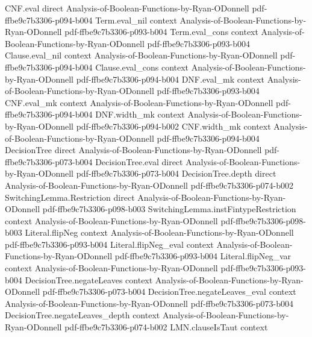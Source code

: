 \begin{lemma}
\proofstep
  {CNF.eval}
  {direct}
  {Analysis-of-Boolean-Functions-by-Ryan-ODonnell}
  {pdf-ffbe9c7b3306-p094-b004}
\proofstep
  {Term.eval_nil}
  {context}
  {Analysis-of-Boolean-Functions-by-Ryan-ODonnell}
  {pdf-ffbe9c7b3306-p093-b004}
\proofstep
  {Term.eval_cons}
  {context}
  {Analysis-of-Boolean-Functions-by-Ryan-ODonnell}
  {pdf-ffbe9c7b3306-p093-b004}
\proofstep
  {Clause.eval_nil}
  {context}
  {Analysis-of-Boolean-Functions-by-Ryan-ODonnell}
  {pdf-ffbe9c7b3306-p094-b004}
\proofstep
  {Clause.eval_cons}
  {context}
  {Analysis-of-Boolean-Functions-by-Ryan-ODonnell}
  {pdf-ffbe9c7b3306-p094-b004}
\proofstep
  {DNF.eval_mk}
  {context}
  {Analysis-of-Boolean-Functions-by-Ryan-ODonnell}
  {pdf-ffbe9c7b3306-p093-b004}
\proofstep
  {CNF.eval_mk}
  {context}
  {Analysis-of-Boolean-Functions-by-Ryan-ODonnell}
  {pdf-ffbe9c7b3306-p094-b004}
\proofstep
  {DNF.width_mk}
  {context}
  {Analysis-of-Boolean-Functions-by-Ryan-ODonnell}
  {pdf-ffbe9c7b3306-p094-b002}
\proofstep
  {CNF.width_mk}
  {context}
  {Analysis-of-Boolean-Functions-by-Ryan-ODonnell}
  {pdf-ffbe9c7b3306-p094-b004}
\proofstep
  {DecisionTree}
  {direct}
  {Analysis-of-Boolean-Functions-by-Ryan-ODonnell}
  {pdf-ffbe9c7b3306-p073-b004}
\proofstep
  {DecisionTree.eval}
  {direct}
  {Analysis-of-Boolean-Functions-by-Ryan-ODonnell}
  {pdf-ffbe9c7b3306-p073-b004}
\proofstep
  {DecisionTree.depth}
  {direct}
  {Analysis-of-Boolean-Functions-by-Ryan-ODonnell}
  {pdf-ffbe9c7b3306-p074-b002}
\proofstep
  {SwitchingLemma.Restriction}
  {direct}
  {Analysis-of-Boolean-Functions-by-Ryan-ODonnell}
  {pdf-ffbe9c7b3306-p098-b003}
\proofstep
  {SwitchingLemma.instFintypeRestriction}
  {context}
  {Analysis-of-Boolean-Functions-by-Ryan-ODonnell}
  {pdf-ffbe9c7b3306-p098-b003}
\proofstep
  {Literal.flipNeg}
  {context}
  {Analysis-of-Boolean-Functions-by-Ryan-ODonnell}
  {pdf-ffbe9c7b3306-p093-b004}
\proofstep
  {Literal.flipNeg_eval}
  {context}
  {Analysis-of-Boolean-Functions-by-Ryan-ODonnell}
  {pdf-ffbe9c7b3306-p093-b004}
\proofstep
  {Literal.flipNeg_var}
  {context}
  {Analysis-of-Boolean-Functions-by-Ryan-ODonnell}
  {pdf-ffbe9c7b3306-p093-b004}
\proofstep
  {DecisionTree.negateLeaves}
  {context}
  {Analysis-of-Boolean-Functions-by-Ryan-ODonnell}
  {pdf-ffbe9c7b3306-p073-b004}
\proofstep
  {DecisionTree.negateLeaves_eval}
  {context}
  {Analysis-of-Boolean-Functions-by-Ryan-ODonnell}
  {pdf-ffbe9c7b3306-p073-b004}
\proofstep
  {DecisionTree.negateLeaves_depth}
  {context}
  {Analysis-of-Boolean-Functions-by-Ryan-ODonnell}
  {pdf-ffbe9c7b3306-p074-b002}
\proofstep
  {LMN.clauseIsTaut}
  {context}

\end{lemma}
